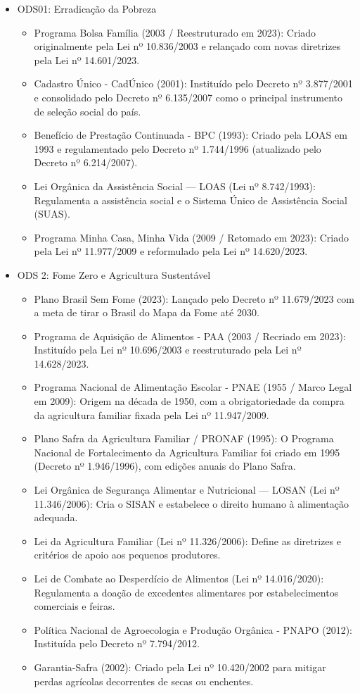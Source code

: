 \begin{itemize}
\item ODS01: Erradicação da Pobreza
\begin{itemize}
\item Programa Bolsa Família (2003 / Reestruturado em 2023): Criado originalmente pela Lei nº 10.836/2003 e relançado com novas diretrizes pela Lei nº 14.601/2023.
\item Cadastro Único - CadÚnico (2001): Instituído pelo Decreto nº 3.877/2001 e consolidado pelo Decreto nº 6.135/2007 como o principal instrumento de seleção social do país.
\item Benefício de Prestação Continuada - BPC (1993): Criado pela LOAS em 1993 e regulamentado pelo Decreto nº 1.744/1996 (atualizado pelo Decreto nº 6.214/2007).
\item Lei Orgânica da Assistência Social — LOAS (Lei nº 8.742/1993): Regulamenta a assistência social e o Sistema Único de Assistência Social (SUAS).
\item Programa Minha Casa, Minha Vida (2009 / Retomado em 2023): Criado pela Lei nº 11.977/2009 e reformulado pela Lei nº 14.620/2023.
\end{itemize}
\item ODS 2: Fome Zero e Agricultura Sustentável
\begin{itemize}
\item Plano Brasil Sem Fome (2023): Lançado pelo Decreto nº 11.679/2023 com a meta de tirar o Brasil do Mapa da Fome até 2030.
\item Programa de Aquisição de Alimentos - PAA (2003 / Recriado em 2023): Instituído pela Lei nº 10.696/2003 e reestruturado pela Lei nº 14.628/2023.
\item Programa Nacional de Alimentação Escolar - PNAE (1955 / Marco Legal em 2009): Origem na década de 1950, com a obrigatoriedade da compra da agricultura familiar fixada pela Lei nº 11.947/2009.
\item Plano Safra da Agricultura Familiar / PRONAF (1995): O Programa Nacional de Fortalecimento da Agricultura Familiar foi criado em 1995 (Decreto nº 1.946/1996), com edições anuais do Plano Safra.
\item Lei Orgânica de Segurança Alimentar e Nutricional — LOSAN (Lei nº 11.346/2006): Cria o SISAN e estabelece o direito humano à alimentação adequada.
\item Lei da Agricultura Familiar (Lei nº 11.326/2006): Define as diretrizes e critérios de apoio aos pequenos produtores.
\item Lei de Combate ao Desperdício de Alimentos (Lei nº 14.016/2020): Regulamenta a doação de excedentes alimentares por estabelecimentos comerciais e feiras.
\item Política Nacional de Agroecologia e Produção Orgânica - PNAPO (2012): Instituída pelo Decreto nº 7.794/2012.
\item Garantia-Safra (2002): Criado pela Lei nº 10.420/2002 para mitigar perdas agrícolas decorrentes de secas ou enchentes.
\end{itemize}
\end{itemize}
